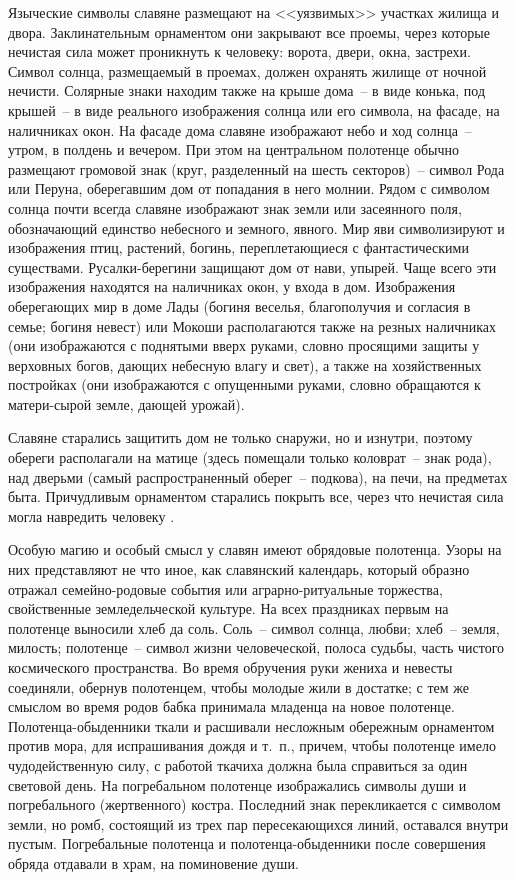 \documentclass[pscyr,titlepage,chapters]{hedreport}
\begin{document}
  Языческие символы славяне размещают на <<уязвимых>> участках жилища и двора.
  Заклинательным орнаментом они закрывают все проемы, через которые нечистая
  сила может проникнуть к человеку: ворота, двери, окна, застрехи. Символ
  солнца, размещаемый в проемах, должен охранять жилище от ночной нечисти.
  Солярные знаки находим также на крыше дома~-- в виде конька, под крышей~-- в
  виде реального изображения солнца или его символа, на фасаде, на наличниках
  окон. На фасаде дома славяне изображают небо и ход солнца~-- утром, в полдень
  и вечером. При этом на центральном полотенце обычно размещают громовой знак
  (круг, разделенный на шесть секторов)~-- символ Рода или Перуна, оберегавшим
  дом от попадания в него молнии. Рядом с символом солнца почти всегда славяне
  изображают знак земли или засеянного поля, обозначающий единство небесного и
  земного, явного. Мир яви символизируют и изображения птиц, растений, богинь,
  переплетающиеся с фантастическими существами. Русалки-берегини защищают дом от
  нави, упырей. Чаще всего эти изображения находятся на наличниках окон, у входа
  в дом. Изображения оберегающих мир в доме Лады (богиня веселья, благополучия и
  согласия в семье; богиня невест) или Мокоши располагаются также на резных
  наличниках (они изображаются с поднятыми вверх руками, словно просящими защиты
  у верховных богов, дающих небесную влагу и свет), а также на хозяйственных
  постройках (они изображаются с опущенными руками, словно обращаются к
  матери-сырой земле, дающей урожай).
 
  Славяне старались защитить дом не только снаружи, но и изнутри, поэтому
  обереги располагали на матице (здесь помещали только коловрат~-- знак рода),
  над дверьми (самый распространенный оберег~-- подкова), на печи, на предметах
  быта. Причудливым орнаментом старались покрыть все, через что нечистая сила
  могла навредить человеку \cite{2}.

  Особую магию и особый смысл у славян имеют обрядовые полотенца. Узоры на них
  представляют не что иное, как славянский календарь, который образно отражал
  семейно-родовые события или аграрно-ритуальные торжества, свойственные
  земледельческой культуре. На всех праздниках первым на полотенце выносили хлеб
  да соль. Соль~-- символ солнца, любви; хлеб~-- земля, милость; полотенце~--
  символ жизни человеческой, полоса судьбы, часть чистого космического
  пространства. Во время обручения руки жениха и невесты соединяли, обернув
  полотенцем, чтобы молодые жили в достатке; с тем же смыслом во время родов
  бабка принимала младенца на новое полотенце. Полотенца-обыденники ткали и
  расшивали несложным обережным орнаментом против мора, для испрашивания дождя
  и т.~п., причем, чтобы полотенце имело чудодейственную силу, с работой ткачиха
  должна была справиться за один световой день. На погребальном полотенце
  изображались символы души и погребального (жертвенного) костра. Последний знак
  перекликается с символом земли, но ромб, состоящий из трех пар пересекающихся
  линий, оставался внутри пустым. Погребальные полотенца и полотенца-обыденники
  после совершения обряда отдавали в храм, на поминовение души.
\end{document}
